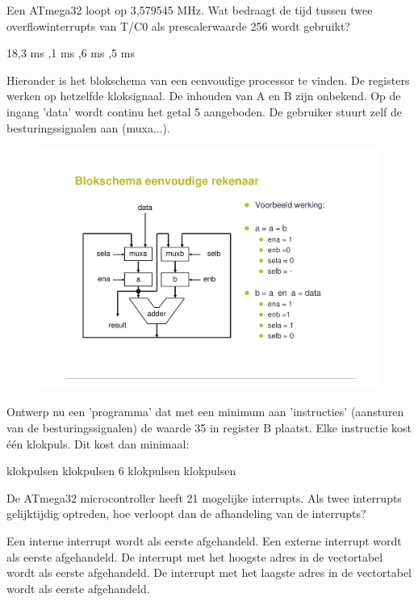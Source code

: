 \documentclass[a4paper,12pt,fleqn,dutch]{tisdexam}
\begin{document}
\begin{questions}
\question
\label{opg:opg16}
Een ATmega32 loopt op 3,579545 MHz. Wat bedraagt de tijd tussen twee overflowinterrupts
van T/C0 als prescalerwaarde 256 wordt gebruikt?
\begin{choices}
	\CorrectChoice \label{ans:opg16} 18,3 ms
	,1 ms
	,6 ms
	,5 ms
\end{choices}


\question
\label{opg:opg17}
Hieronder is het blokschema van een eenvoudige processor te vinden. De registers werken op
hetzelfde kloksignaal. De inhouden van A en B zijn onbekend. Op de ingang 'data' wordt
continu het getal 5 aangeboden. De gebruiker stuurt zelf de besturingssignalen aan (muxa...).
\begin{figure}[H]
  \centering
    \includegraphics*[viewport=70 110 500 460,scale=0.55]{pINLMIC_eenvoudige_rekenaar.pdf}
\end{figure}
Ontwerp nu een 'programma' dat met een minimum aan 'instructies' (aansturen van de
besturingssignalen) de waarde 35 in register B plaatst. Elke instructie kost \'{e}\'{e}n
klokpuls. Dit kost dan minimaal:
\begin{choices}
	 klokpulsen
	 klokpulsen
	\CorrectChoice \label{ans:opg17} 6 klokpulsen
	 klokpulsen
\end{choices}


\question
\label{opg:opg18}
De ATmega32 microcontroller heeft 21 mogelijke interrupts. Als twee interrupts gelijktijdig
optreden, hoe verloopt dan de afhandeling van de interrupts?
\begin{choices}
	\choice Een interne interrupt wordt als eerste afgehandeld.
	\choice Een externe interrupt wordt als eerste afgehandeld.
	\choice De interrupt met het hoogste adres in de vectortabel wordt als eerste afgehandeld.
	\CorrectChoice \label{ans:opg18} De interrupt met het laagste adres in de vectortabel wordt als eerste afgehandeld.
\end{choices}



\end{questions}
\end{document}
